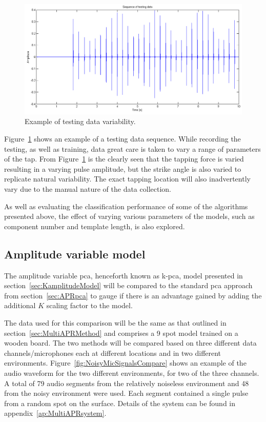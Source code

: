 \begin{figure}[!]
\centering
\includegraphics[width=410 px]{dataSequence.png}
\caption{Example of testing data variability.}\label{fig:dataSequence}
\end{figure}

Figure~\ref{fig:dataSequence} shows an example of a testing data sequence. While recording the testing, as well as training, data great care is taken to vary a range of parameters of the tap. From Figure~\ref{fig:dataSequence} is the clearly seen that the tapping force is varied resulting in a varying pulse amplitude, but the strike angle is also varied to replicate natural variability. The exact tapping location will also inadvertently vary due to the manual nature of the data collection.


As well as evaluating the classification performance of some of the algorithms presented above, the effect of varying various parameters of the models, such as component number and template length, is also explored.

\subsection{Amplitude variable model}
The amplitude variable \gls{pca}, henceforth known as \gls{k-pca}, model presented in section~\ref{sec:KamplitudeModel} will be compared to the standard \gls{pca}  approach from section~\ref{sec:APRpca} to gauge if there is an advantage gained by adding the additional $K$ scaling factor to the model.

The data used for this comparison will be the same as that outlined in section~\ref{sec:MultiAPRMethod} and comprises a 9 spot model trained on a wooden board. The two methods will be compared based on three different data channels/microphones each at different locations and in two different environments. Figure~\ref{fig:NoisyMicSignalsCompare} shows an example of the audio waveform for the two different environments, for two of the three channels. A total of 79 audio segments from the relatively noiseless environment and 48 from the noisy environment were used. Each segment contained a single pulse from a random spot on the surface. Details of the system can be found in appendix~\ref{ap:MultiAPRsystem}.

